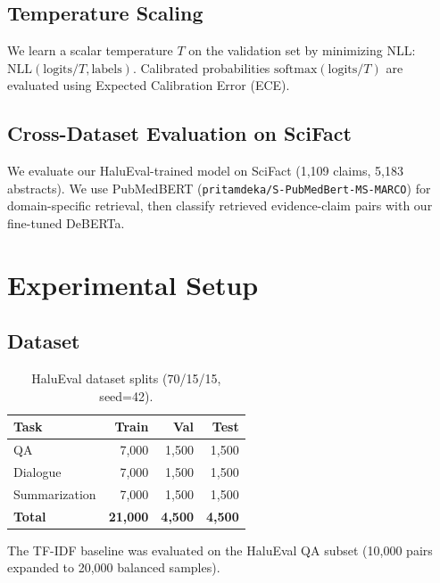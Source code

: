 \documentclass[11pt]{article}
\begin{document}
\subsection{Temperature Scaling}

We learn a scalar temperature $T$ on the validation set by minimizing NLL: $\text{NLL}(\text{logits}/T, \text{labels})$. Calibrated probabilities $\text{softmax}(\text{logits}/T)$ are evaluated using Expected Calibration Error (ECE).

\subsection{Cross-Dataset Evaluation on SciFact}

We evaluate our HaluEval-trained model on SciFact \cite{wadden2020fact} (1,109 claims, 5,183 abstracts). We use PubMedBERT (\texttt{pritamdeka/S-PubMedBert-MS-MARCO}) for domain-specific retrieval, then classify retrieved evidence-claim pairs with our fine-tuned DeBERTa.

\section{Experimental Setup}

\subsection{Dataset}

\begin{table}[h]
\centering
\small
\begin{tabular}{lrrr}
\toprule
\textbf{Task} & \textbf{Train} & \textbf{Val} & \textbf{Test} \\
\midrule
QA & 7,000 & 1,500 & 1,500 \\
Dialogue & 7,000 & 1,500 & 1,500 \\
Summarization & 7,000 & 1,500 & 1,500 \\
\midrule
\textbf{Total} & \textbf{21,000} & \textbf{4,500} & \textbf{4,500} \\
\bottomrule
\end{tabular}
\caption{HaluEval dataset splits (70/15/15, seed=42).}
\label{tab:dataset}
\end{table}

The TF-IDF baseline was evaluated on the HaluEval QA subset (10,000 pairs expanded to 20,000 balanced samples).
\end{document}
